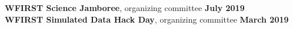 \documentclass[margin]{res}
\begin{document}
\begin{resume}
\textbf{WFIRST Science Jamboree}, organizing committee \hfill \textbf{July 2019}\\
\textbf{WFIRST Simulated Data Hack Day}, organizing committee \hfill \textbf{March 2019}




\end{resume}
\end{document}
